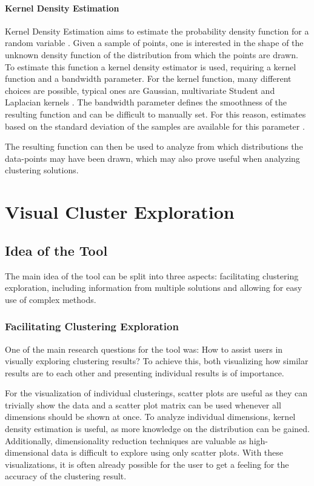 \documentclass[
	a4paper,
	english,
	twoside,
	openright,               
	11pt                            
	]{report}
\begin{document}
\subsection{Kernel Density Estimation}
Kernel Density Estimation aims to estimate the probability density function for a random variable \cite{parzen1962estimation}. Given a sample of points, one is interested in the shape of the unknown density function of the distribution from which the points are drawn. To estimate this function a kernel density estimator is used, requiring a kernel function and a bandwidth parameter. For the kernel function, many different choices are possible, typical ones are Gaussian, multivariate Student and Laplacian kernels \cite{kim2011robust}. The bandwidth parameter defines the smoothness of the resulting function and can be difficult to manually set. For this reason, estimates based on the standard deviation of the samples are available for this parameter \cite{rulethumbdens}.

The resulting function can then be used to analyze from which distributions the data-points may have been drawn, which may also prove useful when analyzing clustering solutions.

\part{Visual Cluster Exploration}
\chapter{Idea of the Tool}\label{cha:idea}

The main idea of the tool can be split into three aspects: facilitating clustering exploration, including information from multiple solutions and allowing for easy use of complex methods.

\section{Facilitating Clustering Exploration}
One of the main research questions for the tool was: How to assist users in visually exploring clustering results? To achieve this, both visualizing how similar results are to each other and presenting individual results is of importance.

 For the visualization of individual clusterings, scatter plots are useful as they can trivially show the data and a scatter plot matrix can be used whenever all dimensions should be shown at once. To analyze individual dimensions, kernel density estimation is useful, as more knowledge on the distribution can be gained. Additionally, dimensionality reduction techniques are valuable as high-dimensional data is difficult to explore using only scatter plots. With these visualizations, it is often already possible for the user to get a feeling for the accuracy of the clustering result.
\end{document}
